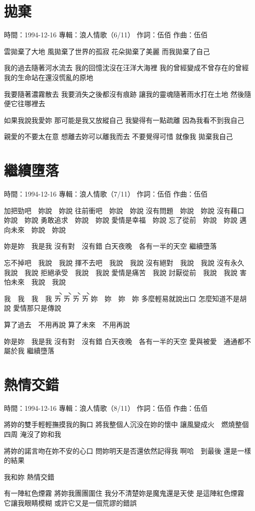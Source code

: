 \documentclass[UTF8,a4paper,oneside,twocolumn,12pt]{ctexbook}
\newcommand{\infopair}[2]{\textbullet #1：#2}
\newcommand{\zc}[1][伍佰]{\infopair{作詞}{#1}}
\newcommand{\zq}[1][伍佰]{\infopair{作曲}{#1}}
\newcommand{\zj}[1]{\infopair{專輯}{#1}}
\newcommand{\sj}[1]{\infopair{時間}{#1}}
\newenvironment{info}{\begin{flushleft}\kaishu
	}
	{\end{flushleft}\normalsize\yahei\par}
\newenvironment{lyric}{
	}
{}
\begin{document}
\section{拋棄}
\begin{info}
	\sj{1994-12-16}
	\zj{浪人情歌（6/11）}
	\zc
	\zq
\end{info}
\begin{lyric}
	雲拋棄了大地
	風拋棄了世界的孤寂
	花朵拋棄了美麗
	而我拋棄了自己

	我的過去隨著河水流去
	我的回憶沈沒在汪洋大海裡
	我的曾經變成不曾存在的曾經
	我的生命站在還沒慌亂的原地

	我要隨著濃霧散去
	我要消失之後都沒有痕跡
	讓我的靈魂隨著雨水打在土地
	然後隨便它往哪裡去

	如果我說我愛妳
	那可能是我又放縱自己
	我變得有一點疏離
	因為我看不到我自己

	親愛的不要太在意
	想離去妳可以離我而去
	不要覺得可惜
	就像我 拋棄我自己
\end{lyric}

\section{繼續墮落}
\begin{info}
	\sj{1994-12-16}
	\zj{浪人情歌（7/11）}
	\zc
	\zq
\end{info}
\begin{lyric}
	加把勁吧　妳說　妳說
	往前衝吧　妳說　妳說
	沒有問題　妳說　妳說
	沒有藉口　妳說　妳說
	勇敢追求　妳說　妳說
	愛情是幸福　妳說
	忘了從前　妳說　妳說
	邁向未來　妳說　妳說

	妳是妳　我是我
	沒有對　沒有錯
	白天夜晚　各有一半的天空
	繼續墮落

	忘不掉吧　我說　我說
	揮不去吧　我說　我說
	沒有絕對　我說　我說
	沒有永久　我說　我說
	拒絕承受　我說　我說
	愛情是痛苦　我說
	討厭從前　我說　我說
	害怕未來　我說　我說

	我　我　我　我
	\`ㄞ \`ㄞ \`ㄞ \`ㄞ
	妳　妳　妳　妳
	多麼輕易就說出口
	怎麼知道不是胡說
	愛情那只是傳說

	算了過去　不用再說
	算了未來　不用再說

	妳是妳　我是我
	沒有對　沒有錯
	白天夜晚　各有一半的天空
	愛與被愛　通通都不屬於我
	繼續墮落
\end{lyric}

\section{熱情交錯}
\begin{info}
	\sj{1994-12-16}
	\zj{浪人情歌（8/11）}
	\zc
	\zq
\end{info}
\begin{lyric}
	將妳的雙手輕輕撫摸我的胸口
	將我整個人沉没在妳的懷中
	讓風變成火　燃燒整個四周
	淹沒了妳和我

	將妳的諾言吻在妳不安的心口
	問妳明天是否還依然記得我
	啊哈　到最後
	還是一樣的結果

	我和妳
	熱情交錯

	有一陣紅色煙霧
	將妳我團團圍住
	我分不清楚妳是魔鬼還是天使
	是這陣紅色煙霧
	它讓我眼睛模糊
	或許它又是一個荒謬的錯誤
\end{lyric}
\end{document}
